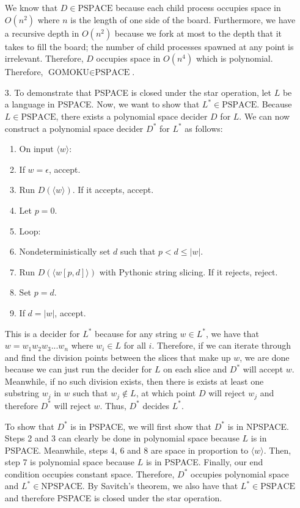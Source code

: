 \documentclass[11pt, reqno]{amsart}
\theoremstyle{plain}
\theoremstyle{definition}
\newcounter{r}
\def\tab{\hspace{10pt}}
\begin{document}
\begin{enumerate}
    We know that $D\in\text{PSPACE}$ because each child process occupies space
    in $O(n^2)$ where $n$ is the length of one side of the board. Furthermore,
    we have a recursive depth in $O(n^2)$ because we fork at most to the depth
    that it takes to fill the board; the number of child processes spawned at
    any point is irrelevant. Therefore, $D$ occupies space in $O(n^4)$ which is
    polynomial. Therefore, $\text{GOMOKU}\in\text{PSPACE}$.

  \item[3.] To demonstrate that PSPACE is closed under the star operation, let
    $L$ be a language in PSPACE. Now, we want to show that
    $L^*\in\text{PSPACE}$. Because $L\in\text{PSPACE}$, there exists a
    polynomial space decider $D$ for $L$. We can now construct a polynomial
    space decider $D^*$ for $L^*$ as follows:
    \begin{enumerate}[1.]
      \item On input $\langle w\rangle$:
      \item \tab If $w = \epsilon$, accept.
      \item \tab Run $D(\langle w\rangle)$. If it accepts, accept.
      \item \tab Let $p = 0$.
      \item \tab Loop:
      \item \tab\tab Nondeterministically set $d$ such that $p < d \leq |w|$.
      \item \tab\tab Run $D(\langle w[p, d]\rangle)$ with Pythonic string
        slicing. If it rejects, reject.
      \item \tab\tab Set $p = d$.
      \item \tab\tab If $d = |w|$, accept.
    \end{enumerate}
    This is a decider for $L^*$ because for any string $w\in L^*$, we have that
    $w = w_1w_2w_3...w_n$ where $w_i\in L$ for all $i$. Therefore, if we can
    iterate through and find the division points between the slices that make up
    $w$, we are done because we can just run the decider for $L$ on each slice
    and $D^*$ will accept $w$. Meanwhile, if no such division exists, then
    there is exists at least one substring $w_j$ in $w$ such that $w_j\notin
    L$, at which point $D$ will reject $w_j$ and therefore $D^*$ will reject
    $w$. Thus, $D^*$ decides $L^*$.

    To show that $D^*$ is in PSPACE, we will first show that $D^*$ is in
    NPSPACE. Steps 2 and 3 can clearly be done in polynomial space because $L$
    is in PSPACE. Meanwhile, steps 4, 6 and 8 are space in proportion to
    $\langle w\rangle$. Then, step 7 is polynomial space because $L$ is in
    PSPACE. Finally, our end condition occupies constant space. Therefore,
    $D^*$ occupies polynomial space and $L^*\in\text{NPSPACE}$. By Savitch's
    theorem, we also have that $L^*\in\text{PSPACE}$ and therefore PSPACE is
    closed under the star operation.
\end{enumerate}
\end{document}
